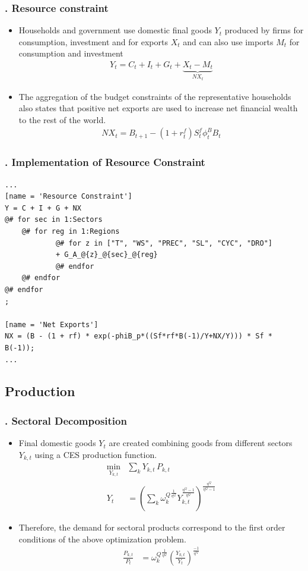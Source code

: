 \documentclass[11pt,aspectratio=169]{beamer}
\begin{document}
\begin{frame}
\frametitle{{\thesection.\thesubsection} Resource constraint}
\scriptsize
\begin{itemize}
\item Households and government use domestic final goods $Y_t$ produced by firms for consumption, investment and for exports $X_{t}$ and can also use imports $M_t$ for consumption and investment
\begin{align}
Y_{t} = C_{t} + I_{t} + G_{t} + \underbrace{X_{t} - M_{t}}_{NX_{t}}
\end{align}
\item The aggregation of the budget constraints of the representative households also states that positive net exports are used to increase net financial wealth to the rest of the world.
\begin{align}
NX_t = B_{t+1} - (1 + r^{f}_{t}) S^{f}_{t} \phi^B_{t} B_{t}
\end{align}
\end{itemize}
\end{frame}

\begin{frame}[fragile]
\frametitle{{\thesection.\thesubsection} Implementation of Resource Constraint}

\begin{lstlisting}[frame = single]
...
[name = 'Resource Constraint']
Y = C + I + G + NX
@# for sec in 1:Sectors
    @# for reg in 1:Regions
		    @# for z in ["T", "WS", "PREC", "SL", "CYC", "DRO"]
            + G_A_@{z}_@{sec}_@{reg}
		    @# endfor				
    @# endfor
@# endfor
;

[name = 'Net Exports']
NX = (B - (1 + rf) * exp(-phiB_p*((Sf*rf*B(-1)/Y+NX/Y))) * Sf * B(-1));
...
\end{lstlisting}
\end{frame}
%
\subsection{Production}

\begin{frame}
\frametitle{{\thesection.\thesubsection} Sectoral Decomposition}
\scriptsize
\begin{itemize}
\item Final domestic goods $Y_{t}$ are created combining goods from different sectors $Y_{k,t}$ using a CES production function.
\begin{align}
\underset{Y_{k,t}}{\mathrm{min}} & \sum_{k} Y_{k,t} \, P_{k,t} \\ 
Y_{t} &= \left(\sum_{k} {\omega^{Q}_{k}}^{\frac{1}{\eta^Q}} Y_{k,t}^{\frac{\eta^Q-1}{\eta^Q}} \right)^{\frac{\eta^Q}{\eta^Q-1}}
\end{align}

\item Therefore, the demand for sectoral products correspond to the first order conditions of the above optimization problem. 
\begin{align*}
\frac{P_{k,t}}{P_{t}} &= {\omega^{Q}_{k}}^{\frac{1}{\eta^Q}} \left(\frac{Y_{k,t}}{Y_{t}}\right)^{\frac{-1}{\eta^Q}}
\end{align*}
\end{itemize}
\end{frame}
\end{document}
